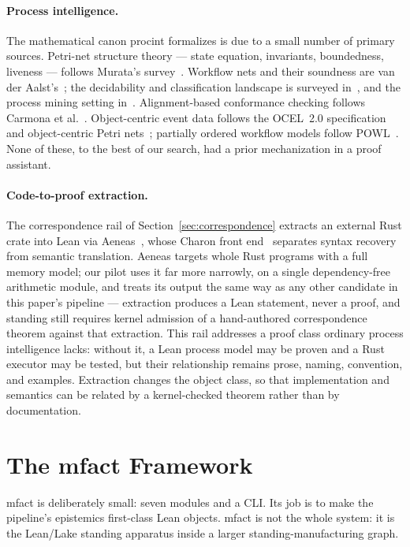 \documentclass[11pt]{article}
\begin{document}
\paragraph{Process intelligence.}
The mathematical canon \textsf{procint} formalizes is due to a small number
of primary sources. Petri-net structure theory --- state equation,
invariants, boundedness, liveness --- follows Murata's
survey~\cite{murata1989}. Workflow nets and their soundness are van der
Aalst's~\cite{vanderaalst1997}; the decidability and classification
landscape is surveyed in~\cite{vanderaalst2011soundness}, and the process
mining setting in~\cite{vanderaalst2011pm}. Alignment-based conformance
checking follows Carmona et al.~\cite{carmona2018}. Object-centric event
data follows the OCEL~2.0 specification~\cite{ocel2} and object-centric
Petri nets~\cite{ocpn2020}; partially ordered workflow models follow
POWL~\cite{powl2023}. None of these, to the best of our search, had a prior
mechanization in a proof assistant.

\paragraph{Code-to-proof extraction.} The correspondence rail of
Section~\ref{sec:correspondence} extracts an external Rust crate into Lean
via Aeneas~\cite{ho2022aeneas}, whose Charon front end~\cite{protzenko2024charon}
separates syntax recovery from semantic translation. Aeneas targets whole
Rust programs with a full memory model; our pilot uses it far more
narrowly, on a single dependency-free arithmetic module, and treats its
output the same way as any other candidate in this paper's pipeline ---
extraction produces a Lean statement, never a proof, and standing still
requires kernel admission of a hand-authored correspondence theorem
against that extraction. This rail addresses a proof class ordinary
process intelligence lacks: without it, a Lean process model may be proven
and a Rust executor may be tested, but their relationship remains prose,
naming, convention, and examples. Extraction changes the object class, so
that implementation and semantics can be related by a kernel-checked
theorem rather than by documentation.

\section{The mfact Framework}
\label{sec:mfact}

\textsf{mfact} is deliberately small: seven modules and a CLI. Its job is to make the pipeline's epistemics first-class Lean objects. mfact is not the whole system: it is the Lean/Lake standing apparatus inside a larger standing-manufacturing graph.
\end{document}
